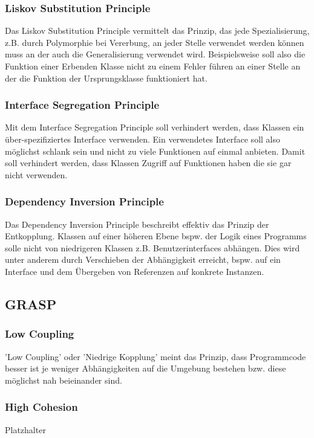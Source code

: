 \documentclass[12pt]{article}
\begin{document}
\subsubsection{Liskov Substitution Principle}
Das Liskov Substitution Principle vermittelt das Prinzip, das jede Spezialisierung, z.B. durch Polymorphie bei Vererbung, an jeder Stelle verwendet werden können muss an der auch die Generalisierung verwendet wird. Beispielsweise soll also die Funktion einer Erbenden Klasse nicht zu einem Fehler führen an einer Stelle an der die Funktion der Ursprungsklasse funktioniert hat.

\subsubsection{Interface Segregation Principle}
Mit dem Interface Segregation Principle soll verhindert werden, dass Klassen ein über-spezifiziertes Interface verwenden. Ein verwendetes Interface soll also möglichst schlank sein und nicht zu viele Funktionen auf einmal anbieten. Damit soll verhindert werden, dass Klassen Zugriff auf Funktionen haben die sie gar nicht verwenden.

\subsubsection{Dependency Inversion Principle}
Das Dependency Inversion Principle beschreibt effektiv das Prinzip der Entkopplung. Klassen auf einer höheren Ebene bspw. der Logik eines Programms solle nicht von niedrigeren Klassen z.B. Benutzerinterfaces abhängen. Dies wird unter anderem durch Verschieben der Abhängigkeit erreicht, bspw. auf ein Interface und dem Übergeben von Referenzen auf konkrete Instanzen.

\subsection{GRASP}

\subsubsection{Low Coupling}
'Low Coupling' oder 'Niedrige Kopplung' meint das Prinzip, dass Programmcode besser ist je weniger Abhängigkeiten auf die Umgebung bestehen bzw. diese möglichst nah beieinander sind.

\subsubsection{High Cohesion}
Platzhalter
\end{document}
